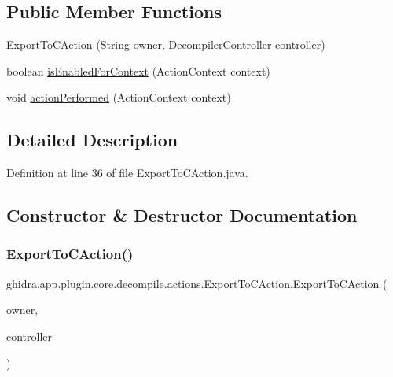 \subsection*{Public Member Functions}
\begin{DoxyCompactItemize}
\item 
\mbox{\hyperlink{classghidra_1_1app_1_1plugin_1_1core_1_1decompile_1_1actions_1_1_export_to_c_action_aad6581e1aa134939ca0242e3b4879c75}{Export\+To\+C\+Action}} (String owner, \mbox{\hyperlink{classghidra_1_1app_1_1decompiler_1_1component_1_1_decompiler_controller}{Decompiler\+Controller}} controller)
\item 
boolean \mbox{\hyperlink{classghidra_1_1app_1_1plugin_1_1core_1_1decompile_1_1actions_1_1_export_to_c_action_a2d7a70335828c99d7c84302bfe504465}{is\+Enabled\+For\+Context}} (Action\+Context context)
\item 
void \mbox{\hyperlink{classghidra_1_1app_1_1plugin_1_1core_1_1decompile_1_1actions_1_1_export_to_c_action_ac10111a590d6d72da51d3a5f43800431}{action\+Performed}} (Action\+Context context)
\end{DoxyCompactItemize}


\subsection{Detailed Description}


Definition at line 36 of file Export\+To\+C\+Action.\+java.



\subsection{Constructor \& Destructor Documentation}
\mbox{\label{classghidra_1_1app_1_1plugin_1_1core_1_1decompile_1_1actions_1_1_export_to_c_action_aad6581e1aa134939ca0242e3b4879c75}} 
\subsubsection{\texorpdfstring{ExportToCAction()}{ExportToCAction()}}
{\footnotesize\ttfamily ghidra.\+app.\+plugin.\+core.\+decompile.\+actions.\+Export\+To\+C\+Action.\+Export\+To\+C\+Action (\begin{DoxyParamCaption}\item[{String}]{owner,  }\item[{\mbox{\hyperlink{classghidra_1_1app_1_1decompiler_1_1component_1_1_decompiler_controller}{Decompiler\+Controller}}}]{controller }\end{DoxyParamCaption})\hspace{0.3cm}{\ttfamily [inline]}}



